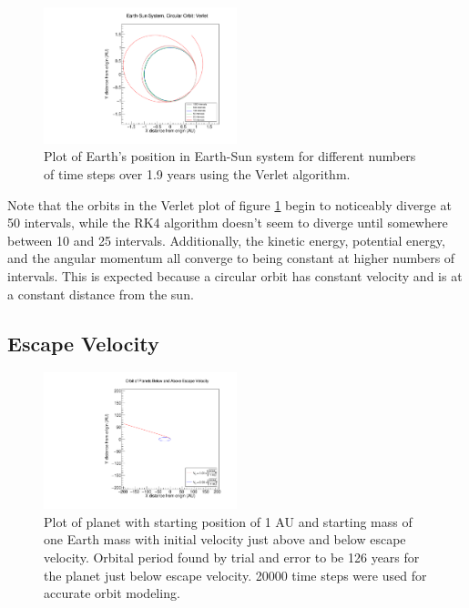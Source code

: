 \documentclass[a4paper,12pt]{report}
\begin{document}
  \begin{figure}
 \centering
   \includegraphics[width=0.5\textwidth]{ESVerlet_position.pdf}
  \caption{Plot of Earth's position in Earth-Sun system for different numbers of time steps over 1.9 years using the Verlet algorithm.}
  \label{fig:ESVerlet_position}
 \end{figure}

 Note that the orbits in the Verlet plot of figure \ref{fig:ESVerlet_position} begin to noticeably diverge at 50 intervals, while the RK4 algorithm doesn't seem to diverge until somewhere between 10 and 25 intervals. Additionally, the kinetic energy, potential energy, and the angular momentum all converge to being constant at higher numbers of intervals. This is expected because a circular orbit has constant velocity and is at a constant distance from the sun.

\subsection{Escape Velocity}

 \begin{figure}
 \centering
   \includegraphics[width=0.5\textwidth]{Escape_plot.pdf}
  \caption{Plot of planet with starting position of 1 AU and starting mass of one Earth mass with initial velocity just above and below escape velocity. Orbital period found by trial and error to be 126 years for the planet just below escape velocity. 20000 time steps were used for accurate orbit modeling.}
  \label{fig:Escape}
 \end{figure}
\end{document}

